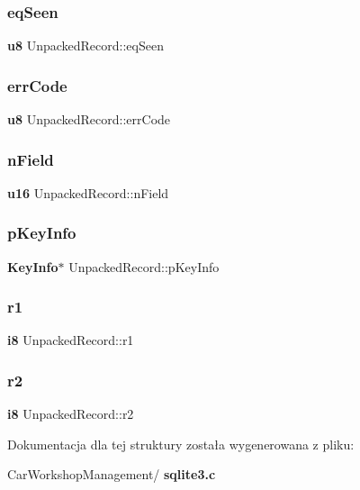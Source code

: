 \subsubsection{eqSeen}
{\footnotesize\ttfamily \textbf{ u8} Unpacked\+Record\+::eq\+Seen}

\mbox{\label{struct_unpacked_record_a5c42d9878256f14c87f0e099b31da4bb}} 
\subsubsection{errCode}
{\footnotesize\ttfamily \textbf{ u8} Unpacked\+Record\+::err\+Code}

\mbox{\label{struct_unpacked_record_a2c5062735cdbc5039679d255cc900668}} 
\subsubsection{nField}
{\footnotesize\ttfamily \textbf{ u16} Unpacked\+Record\+::n\+Field}

\mbox{\label{struct_unpacked_record_aeb43e7a1e300857cab2cbe98eacd575b}} 
\subsubsection{pKeyInfo}
{\footnotesize\ttfamily \textbf{ Key\+Info}$\ast$ Unpacked\+Record\+::p\+Key\+Info}

\mbox{\label{struct_unpacked_record_aff1dc6903bbc46b232d912bd25683b8a}} 
\subsubsection{r1}
{\footnotesize\ttfamily \textbf{ i8} Unpacked\+Record\+::r1}

\mbox{\label{struct_unpacked_record_a57a0cc8800e409d46c7c804bc68b5b2b}} 
\subsubsection{r2}
{\footnotesize\ttfamily \textbf{ i8} Unpacked\+Record\+::r2}



Dokumentacja dla tej struktury została wygenerowana z pliku\+:\begin{DoxyCompactItemize}
\item 
Car\+Workshop\+Management/\textbf{ sqlite3.\+c}\end{DoxyCompactItemize}
